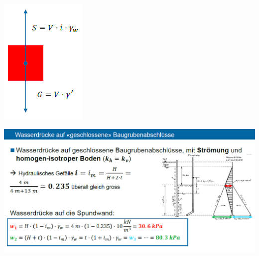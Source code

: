 \begin{minipage}{0.3\linewidth}
	\includegraphics[width=0.5\linewidth]{images/GW21Kraftwirkung.PNG}
\end{minipage}
	\includegraphics[width=0.9\linewidth]{images/GW20Wasserdrucke.PNG}